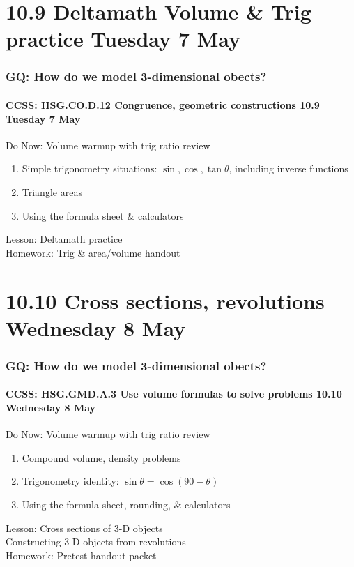 \documentclass{beamer}
\begin{document}
  \section{10.9 Deltamath Volume \& Trig practice Tuesday 7 May}
    \frame
    {
      \frametitle{GQ: How do we model 3-dimensional obects?}
      \framesubtitle{CCSS: HSG.CO.D.12 Congruence, geometric constructions \hfill \alert{10.9 Tuesday 7 May}}
        \begin{block}{Do Now: Volume warmup with trig ratio review}
          \begin{enumerate}
            \item Simple trigonometry situations: $\sin, \cos, \tan \theta$, including inverse functions
            \item Triangle areas
            \item Using the formula sheet \& calculators
        \end{enumerate}
        \end{block}
      Lesson: Deltamath practice \\[0.5cm]
      Homework: Trig \& area/volume handout
    }

  \section{10.10 Cross sections, revolutions Wednesday 8 May}
    \frame
    {
      \frametitle{GQ: How do we model 3-dimensional obects?}
      \framesubtitle{CCSS: HSG.GMD.A.3 Use volume formulas to solve problems \hfill \alert{10.10 Wednesday 8 May}}
      \begin{block}{Do Now: Volume warmup with trig ratio review}
        \begin{enumerate}
          \item Compound volume, density problems
          \item Trigonometry identity: $\sin \theta = \cos (90-\theta)$
          \item Using the formula sheet, rounding, \& calculators
      \end{enumerate}
      \end{block}
      Lesson: Cross sections of 3-D objects\\
      Constructing 3-D objects from revolutions\\[0.5cm]
      Homework: Pretest handout packet
    }
\end{document}
